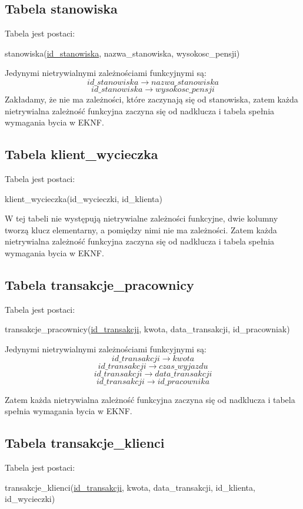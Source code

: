 \documentclass[a4paper,12pt]{mwart}
\begin{document}
\subsection{Tabela stanowiska}
Tabela jest postaci:

stanowiska(\underline{id\_stanowiska}, nazwa\_stanowiska, wysokosc\_pensji)

\noindent Jedynymi nietrywialnymi zależnościami funkcyjnymi są:
$$   id\_stanowiska \rightarrow nazwa\_stanowiska $$
$$   id\_stanowiska \rightarrow wysokosc\_pensji $$
Zakładamy, że nie ma zależności, które zaczynają się od stanowiska,
zatem każda nietrywialna zależność funkcyjna zaczyna się od nadklucza i tabela  spełnia wymagania bycia w EKNF.

\subsection{Tabela klient\_wycieczka}
Tabela jest postaci:

klient\_wycieczka(id\_wycieczki, id\_klienta)

W tej tabeli nie występują nietrywialne zależności funkcyjne, dwie kolumny  tworzą klucz elementarny, a pomiędzy nimi nie ma zależności.
Zatem każda nietrywialna zależność funkcyjna zaczyna się od nadklucza i tabela  spełnia wymagania bycia w EKNF.



\subsection{Tabela transakcje\_pracownicy}
Tabela jest postaci:

transakcje\_pracownicy(\underline{id\_transakcji}, kwota, data\_transakcji, id\_pracowniak)

\noindent Jedynymi nietrywialnymi zależnościami funkcyjnymi są:
$$   id\_transakcji\rightarrow kwota $$
$$   id\_transakcji\rightarrow czas\_wyjazdu$$
$$   id\_transakcji\rightarrow data\_transakcji $$
$$   id\_transakcji\rightarrow id\_pracownika $$

Zatem każda nietrywialna zależność funkcyjna zaczyna się od nadklucza i tabela  spełnia wymagania bycia w EKNF.

\subsection{Tabela transakcje\_klienci}
Tabela jest postaci:

transakcje\_klienci(\underline{id\_transakcji}, kwota, data\_transakcji, id\_klienta, id\_wycieczki)
\end{document}
